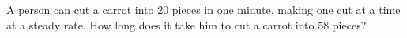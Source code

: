A person can cut a carrot into $20$ pieces in one minute, making one cut at a time at a steady rate. How long does it take him to cut a carrot into $58$ pieces?
